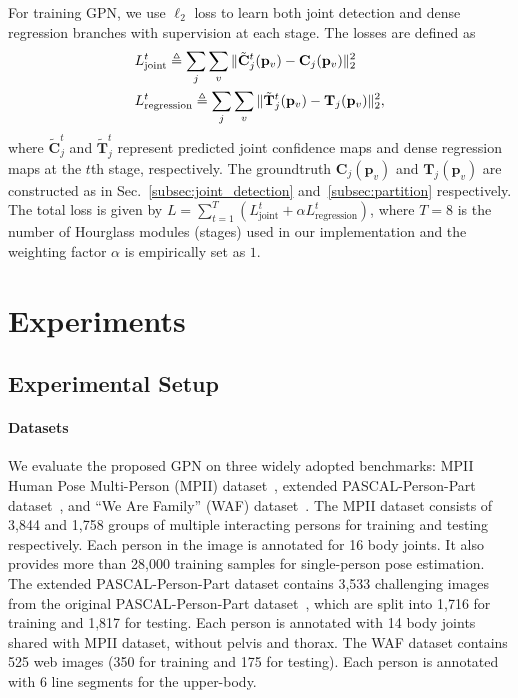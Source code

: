 \documentclass[10pt,twocolumn,letterpaper]{article}
\begin{document}
For training GPN, we use $\ell_2$ loss to learn both joint detection and dense regression branches with supervision at each stage. The losses are defined as
\begin{equation*}
\begin{aligned}
&L_{\text{joint}}^t  \triangleq \sum_{j}\sum_{v}\|\tilde{\mathbf{C}}_{j}^t(\mathbf{p}_v)-\mathbf{C}_{j}(\mathbf{p}_v)\|_2^2 \ \ \ \\
&L_{\text{regression}}^t       \triangleq \sum_{j}\sum_{v}\|\tilde{\mathbf{T}}_{j}^t(\mathbf{p}_v)-\mathbf{T}_{j}(\mathbf{p}_v)\|_2^2,
\end{aligned}
\vspace{-3mm}
\end{equation*}
where $\tilde{\mathbf{C}}_{j}^t$ and $\tilde{\mathbf{T}}_{j}^t$ represent predicted joint confidence maps and dense regression maps at the $t$th stage, respectively.
The groundtruth $\mathbf{C}_{j}(\mathbf{p}_v)$ and $\mathbf{T}_{j}(\mathbf{p}_v)$ are constructed as  in  Sec.~\ref{subsec:joint_detection} and~\ref{subsec:partition} respectively.
The total loss is given by
$L{=}\sum_{t=1}^T(L_{\text{joint}}^t + \alpha L_{\text{regression}}^t)$,
where $T{=}8$ is the number of  Hourglass modules (stages) used in our implementation  and  the weighting factor $\alpha$  is empirically set as $1$.

\section{Experiments}

\subsection{Experimental Setup}

\paragraph{Datasets} We evaluate the proposed GPN  on three widely adopted benchmarks: MPII Human Pose Multi-Person (MPII) dataset~\cite{andriluka14cvpr}, extended PASCAL-Person-Part dataset~\cite{xia2017joint}, and ``We Are Family'' (WAF) dataset~\cite{eichner2010we}. The MPII dataset consists of 3,844  and 1,758  groups of multiple interacting persons for training and testing respectively. Each person in the image is annotated for 16 body joints. It also provides  more than 28,000 training samples for single-person pose estimation. The extended PASCAL-Person-Part dataset contains 3,533 challenging images from the original PASCAL-Person-Part dataset~\cite{chen2014detect}, which are split into 1,716  for training and 1,817  for testing. Each person is annotated with 14 body joints shared with MPII dataset, without pelvis and thorax.  The WAF dataset contains 525 web images (350   for training and 175  for testing). Each person  is annotated with 6 line segments for the upper-body.
\end{document}

